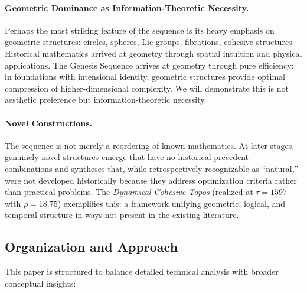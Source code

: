 \documentclass[11pt]{article}
\theoremstyle{definition}
\begin{document}
\paragraph{Geometric Dominance as Information-Theoretic Necessity.}

Perhaps the most striking feature of the sequence is its heavy emphasis on geometric structures: circles, spheres, Lie groups, fibrations, cohesive structures. Historical mathematics arrived at geometry through spatial intuition and physical applications. The Genesis Sequence arrives at geometry through pure efficiency: in foundations with intensional identity, geometric structures provide optimal compression of higher-dimensional complexity. We will demonstrate this is not aesthetic preference but information-theoretic necessity.

\paragraph{Novel Constructions.}

The sequence is not merely a reordering of known mathematics. At later stages, genuinely novel structures emerge that have no historical precedent—combinations and syntheses that, while retrospectively recognizable as ``natural,'' were not developed historically because they address optimization criteria rather than practical problems. The \emph{Dynamical Cohesive Topos} (realized at $\tau=1597$ with $\rho=18.75$) exemplifies this: a framework unifying geometric, logical, and temporal structure in ways not present in the existing literature.

\subsection{Organization and Approach}

This paper is structured to balance detailed technical analysis with broader conceptual insights:
\end{document}
